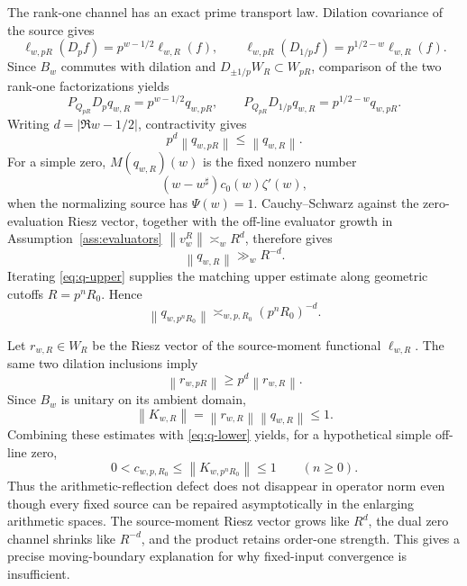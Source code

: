 \documentclass[11pt]{article}
\theoremstyle{remark}
\newcommand{\norm}[1]{\left\lVert #1\right\rVert}
\begin{document}
The rank-one channel has an exact prime transport law. Dilation covariance of the source gives
\[
 \ell_{w,pR}(D_pf)=p^{w-1/2}\ell_{w,R}(f),
 \qquad
 \ell_{w,pR}(D_{1/p}f)=p^{1/2-w}\ell_{w,R}(f).
\]
Since $B_w$ commutes with dilation and $D_{\pm1/p}W_R\subset W_{pR}$, comparison of the two rank-one factorizations yields
\begin{equation}\label{eq:dual-prime-transport}
 \boxed{P_{Q_{pR}}D_pq_{w,R}=p^{w-1/2}q_{w,pR}},
 \qquad
 \boxed{P_{Q_{pR}}D_{1/p}q_{w,R}=p^{1/2-w}q_{w,pR}}.
\end{equation}
Writing $d=|\Re w-1/2|$, contractivity gives
\begin{equation}\label{eq:q-upper}
 p^d\norm{q_{w,pR}}\le\norm{q_{w,R}}.
\end{equation}
For a simple zero, $M(q_{w,R})(w)$ is the fixed nonzero number
\[
 (w-w^\sharp)c_0(w)\zeta'(w),
\]
when the normalizing source has $\Psi(w)=1$. Cauchy--Schwarz against the zero-evaluation Riesz vector, together with the off-line evaluator growth in Assumption~\ref{ass:evaluators} $\norm{v_w^R}\asymp_w R^d$, therefore gives
\begin{equation}\label{eq:q-lower}
 \norm{q_{w,R}}\gg_w R^{-d}.
\end{equation}
Iterating \eqref{eq:q-upper} supplies the matching upper estimate along geometric cutoffs $R=p^nR_0$. Hence
\begin{equation}\label{eq:q-asymp}
 \norm{q_{w,p^nR_0}}\asymp_{w,p,R_0}(p^nR_0)^{-d}.
\end{equation}

Let $r_{w,R}\in W_R$ be the Riesz vector of the source-moment functional $\ell_{w,R}$. The same two dilation inclusions imply
\[
 \norm{r_{w,pR}}\ge p^d\norm{r_{w,R}}.
\]
Since $B_w$ is unitary on its ambient domain,
\[
 \norm{K_{w,R}}=\norm{r_{w,R}}\norm{q_{w,R}}\le1.
\]
Combining these estimates with \eqref{eq:q-lower} yields, for a hypothetical simple off-line zero,
\begin{equation}\label{eq:rankone-persistent}
 0<c_{w,p,R_0}
 \le \norm{K_{w,p^nR_0}}\le1
 \qquad(n\ge0).
\end{equation}
Thus the arithmetic-reflection defect does not disappear in operator norm even though every fixed source can be repaired asymptotically in the enlarging arithmetic spaces. The source-moment Riesz vector grows like $R^d$, the dual zero channel shrinks like $R^{-d}$, and the product retains order-one strength. This gives a precise moving-boundary explanation for why fixed-input convergence is insufficient.
\end{document}
